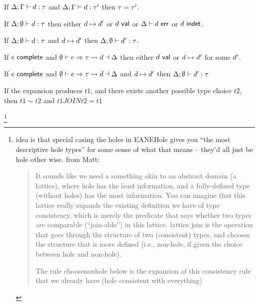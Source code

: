 \begin{theorem}
If $\Delta; \Gamma \vdash d : \tau$ and $\Delta; \Gamma \vdash d : \tau'$ then $\tau=\tau'$.
\end{theorem}

\begin{theorem}[Progress]
If $\Delta; \emptyset \vdash d : \tau$ then either $d \mapsto d'$ or 
$d~\mathsf{val}$ or $\Delta \vdash d~\mathsf{err}$ or $d~\mathsf{indet}$. 
\end{theorem}

\begin{theorem}[Preservation]
  If $\Delta; \emptyset \vdash d : \tau$ and
  $d \mapsto d'$ then
  $\Delta; \emptyset \vdash d' : \tau$. 
\end{theorem}

\begin{theorem}
If $e~\mathsf{complete}$ and
$\emptyset \vdash e \Rightarrow \tau \leadsto d \dashv \Delta$ then either
$d~\mathsf{val}$ or $d \mapsto d'$ for some $d'$.

\end{theorem}

\begin{theorem}
If $e~\mathsf{complete}$ and
$\emptyset \vdash e \Rightarrow \tau \leadsto d \dashv \Delta$ and
$d \mapsto d'$ then
$\Delta; \emptyset \vdash d' : \tau$
\end{theorem}

\begin{theorem}
\end{theorem}


\begin{theorem}
If the expansion produces $t1$, and there exists another possible type choice
$t2$, then $t1 \sim t2$ and $t1 JOIN t2 = t1$
\end{theorem}\footnote{idea is that special casing the holes in EANEHole gives you ``the
most descriptive hole types'' for some sense of what that means -- they'd
all just be hole other wise. from Matt:
\begin{quote}
It sounds like we need a something akin to an abstract domain (a lattice),
where hole has the least information, and a fully-defined type (without
holes) has the most information.  You can imagine that this lattice really
expands the existing definition we have of type consistency, which is
merely the predicate that says whether two types are comparable
(“join-able”) in this lattice.  lattice join is the operation that goes
through the structure of two (consistent) types, and chooses the structure
that is more defined (i.e., non-hole, if given the choice between hole and
non-hole).

The rule choosenonhole below is the expansion of this consistency rule that
we already have (hole consistent with everything)
\end{quote}}

